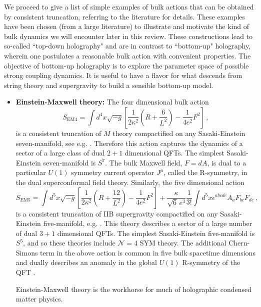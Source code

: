 \documentclass[10pt, oneside]{book}
\def\be{\begin{equation}}
\def\ee{\end{equation}}
\begin{document}
\begin{doublespace}
We proceed to give a list of simple examples of bulk actions that can be obtained by consistent truncation, referring to the literature for details. These examples have been chosen (from a large literature) to illustrate and motivate the kind of bulk dynamics we will encounter later in this review.  These constructions lead to so-called ``top-down holography" and are in contrast to ``bottom-up" holography, wherein one postulates a reasonable bulk action with convenient properties. The objective of bottom-up holography is to explore the parameter space of possible strong coupling dynamics. It is useful to have a flavor for what descends from string theory and supergravity to build a sensible bottom-up model.

\begin{itemize}

\item {\bf Einstein-Maxwell theory:} The four dimensional bulk action
\be\label{eq:S4}
S_{\text{EM4}} = \int d^4x \sqrt{-g} \left[ \frac{1}{2 \kappa^2} \left(R + \frac{6}{L^2} \right) - \frac{1}{4 e^2} F^2 \right] \,,
\ee
is a consistent truncation of $M$ theory compactified on any Sasaki-Einstein seven-manifold, see e.g.
\cite{Herzog:2007ij, Gauntlett:2007ma, Denef:2009tp}. Therefore this action captures the dynamics of a sector of a large class of dual $2+1$ dimensional QFTs. The simplest Sasaki-Einstein seven-manifold is $S^7$. The bulk Maxwell field, $F = dA$, is dual to a particular $U(1)$ symmetry current operator $J^\mu$, called the R-symmetry, in the dual superconformal field theory. Similarly, the five dimensional action
\be\label{eq:S5}
S_{\text{EM5}} = \int d^5x \sqrt{-g} \left[ \frac{1}{2 \kappa^2} \left(R + \frac{12}{L^2} \right) - \frac{1}{4 e^2} F^2 \right] 
+ \frac{\kappa}{\sqrt{6} \, e^3} \frac{1}{3!} \int d^5x \epsilon^{abcde} A_a F_{bc} F_{de} \,,
\ee
is a consistent truncation of IIB supergravity compactified on any Sasaki-Einstein five-manifold, e.g. \cite{Gauntlett:2007ma}. This theory describes a sector of a large number of dual $3+1$ dimensional QFTs. The simplest Sasaki-Einstein five-manifold is $S^5$, and so these theories include ${\mathcal N} = 4$ SYM theory. The additional Chern-Simons term in the above action is common in five bulk spacetime dimensions and dually describes an anomaly in the global $U(1)$ R-symmetry of the QFT \cite{Witten:1998qj}.

Einstein-Maxwell theory is the workhorse for much of holographic condensed matter physics.


\end{itemize}
\end{doublespace}
\end{document}
